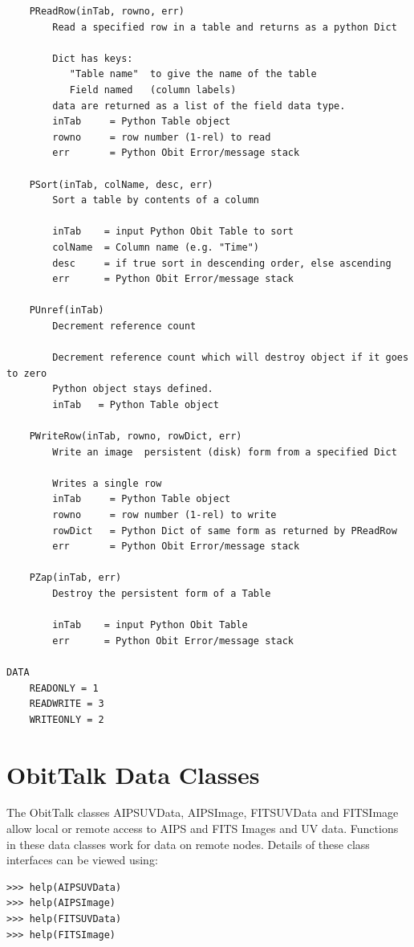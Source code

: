 \documentclass[11pt]{report}
\begin{document}
\begin{verbatim}
    PReadRow(inTab, rowno, err)
        Read a specified row in a table and returns as a python Dict
        
        Dict has keys:
           "Table name"  to give the name of the table
           Field named   (column labels)
        data are returned as a list of the field data type.
        inTab     = Python Table object
        rowno     = row number (1-rel) to read
        err       = Python Obit Error/message stack
    
    PSort(inTab, colName, desc, err)
        Sort a table by contents of a column
        
        inTab    = input Python Obit Table to sort
        colName  = Column name (e.g. "Time")
        desc     = if true sort in descending order, else ascending
        err      = Python Obit Error/message stack
    
    PUnref(inTab)
        Decrement reference count
        
        Decrement reference count which will destroy object if it goes to zero
        Python object stays defined.
        inTab   = Python Table object
    
    PWriteRow(inTab, rowno, rowDict, err)
        Write an image  persistent (disk) form from a specified Dict
        
        Writes a single row
        inTab     = Python Table object
        rowno     = row number (1-rel) to write
        rowDict   = Python Dict of same form as returned by PReadRow
        err       = Python Obit Error/message stack
    
    PZap(inTab, err)
        Destroy the persistent form of a Table
        
        inTab    = input Python Obit Table
        err      = Python Obit Error/message stack

DATA
    READONLY = 1
    READWRITE = 3
    WRITEONLY = 2

\end{verbatim}

\section{ObitTalk Data Classes}
   The ObitTalk classes  AIPSUVData, AIPSImage, FITSUVData and
FITSImage allow local or remote access to AIPS and FITS Images
and UV data.  
Functions in these data classes work for data on remote nodes.
Details of these class interfaces can be viewed using:
\begin{verbatim}
>>> help(AIPSUVData)
>>> help(AIPSImage)
>>> help(FITSUVData)
>>> help(FITSImage)
\end{verbatim}
\end{document}

